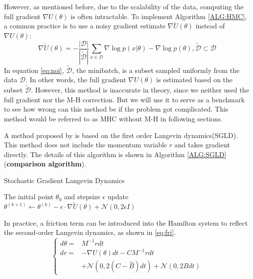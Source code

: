 \documentclass[11pt]{article}
\begin{document}
However, as mentioned before, due to the scalability of the data, computing the full gradient $\nabla U(\theta)$ is often intractable. To implement Algorithm \ref{ALG:HMC}, a common practice is to use a noisy gradient estimate $\nabla \tilde{U}(\theta)$ instead of $\nabla U(\theta)$:
\begin{equation}
    \nabla \tilde{U}(\theta)=-\frac{|\mathcal{D}|}{|\tilde{\mathcal{D}}|} \sum_{x \in \mathcal{D}} \nabla \log p(x | \theta)-\nabla \log p(\theta), \tilde{\mathcal{D}} \subset \mathcal{D}\label{eq:noi}
\end{equation}
In equation \eqref{eq:noi},  $\tilde{\mathcal{D}}$, the minibatch, is a subset sampled uniformly from the data $\mathcal{D}$. In other words, the full gradient $\nabla U(\theta)$ is estimated based on the subset $\tilde{\mathcal{D}}$. However, this method is inaccurate in theory, since we neither used the full gradient nor the M-H correction. But we will use it to serve as a benchmark to see how wrong can this method be if the problem got complicated. This method would be referred to as MHC without M-H in following sections.


A method proposed by \cite{welling2011bayesian} is based on the first order Langevin dynamics(SGLD). This method does not include the momentum variable $r$ and takes gradient directly. The details of this algorithm is shown in Algorithm \ref{ALG:SGLD}(\textbf{comparison algorithm}).
\begin{algorithm}
	\caption{Stochastic Gradient Langevin Dynamics}
	\label{ALG:SGLD}
	\begin{algorithmic} 
		\REQUIRE The initial point $\theta_0$ and stepsize $\epsilon$
        \STATE update $\theta^{(k+1)} \leftarrow \theta^{(k)}-\epsilon \cdot \nabla \tilde{U}(\theta)+\mathcal{N}\left(0,2 \epsilon I\right)$
		\ENDFOR
	\end{algorithmic}
\end{algorithm}

In practice, a friction term can be introduced into the Hamilton system to reflect the second-order Langevin dynamics, as shown in \eqref{eq:fri}. 
\begin{equation}
    \left\{\begin{aligned} d \theta=& M^{-1} r d t \\ d r=&-\nabla U(\theta) d t-C M^{-1} r d t \\ &+\mathcal{N}(0,2(C-\hat{B}) d t)+\mathcal{N}(0,2 B d t) \end{aligned}\right. \label{eq:fri}
\end{equation}
\end{document}

